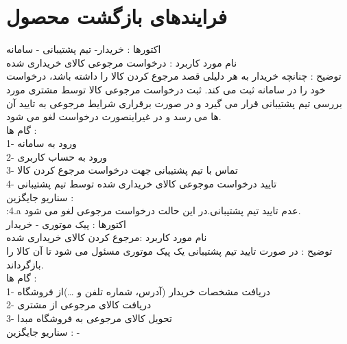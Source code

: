 \documentclass[14pt]{article}
\begin{document}
 
\section{ فرایندهای بازگشت محصول}
 
اکتورها : خریدار- تیم پشتیبانی - سامانه    \\
نام مورد کاربرد : درخواست مرجوعی کالای خریداری شده\\
توضیح : چنانچه خریدار به هر دلیلی قصد مرجوع کردن کالا را داشته باشد، درخواست خود را در سامانه ثبت می کند. ثبت درخواست مرجوعی کالا توسط مشتری مورد بررسی تیم پشتیبانی قرار می گیرد و در صورت برقراری شرایط مرجوعی به تایید آن ها می رسد و در غیراینصورت درخواست لغو می شود.\\
گام ها :\\
1- ورود به سامانه\\
2- ورود به حساب کاربری\\
3-  تماس با تیم پشتیبانی جهت درخواست مرجوع کردن کالا\\
4- تایید درخواست موجوعی کالای خریداری شده توسط تیم پشتیبانی\\
سناریو جایگزین : \\
:4.a عدم تایید تیم پشتیبانی.در این حالت درخواست مرجوعی لغو می شود.\\


اکتورها : پیک موتوری - خریدار\\
نام مورد کاربرد :مرجوع کردن کالای خریداری شده\\
توضیح :  در صورت تایید تیم پشتیبانی یک پیک موتوری مسئول می شود تا آن کالا را بازگرداند.\\
گام ها :\\
1- دریافت مشخصات خریدار (آدرس، شماره تلفن و …)از فروشگاه\\
2- دریافت کالای مرجوعی از مشتری\\
3- تحویل کالای مرجوعی به فروشگاه مبدا\\
سناریو جایگزین : -\\
\end{document}
